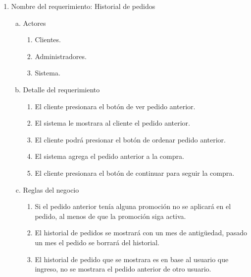 \documentclass[conference]{IEEEtran}
\begin{document}
\begin{enumerate}
\item Nombre del requerimiento: Historial de pedidos
\begin{enumerate}[a)]
\item Actores
	\begin{enumerate}[a]
	\item Clientes.
	\item Administradores.
	\item Sistema.
	\end{enumerate}
\item Detalle del requerimiento
	\begin{enumerate}[P{a}so 1.]
	\item El cliente presionara el botón de ver pedido anterior.
	\item El sistema le mostrara al cliente el pedido anterior.
	\item El cliente podrá presionar el botón de ordenar 	pedido anterior.
	\item El sistema agrega el pedido anterior a la 		compra.
	\item El cliente presionara el botón de continuar 		para seguir la compra.
	\end{enumerate}
\item Reglas del negocio
	\begin{enumerate}[a]
	\item Si el pedido anterior tenía alguna promoción no se aplicará en el pedido, al menos de que la promoción siga activa.
	\item El historial de pedidos se mostrará con un mes de antigüedad, pasado un mes el pedido se borrará del historial.
	\item El historial de pedido que se mostrara es en base al usuario que ingreso, no se mostrara el pedido anterior de otro usuario.

	\end{enumerate}
\end{enumerate}


\end{enumerate}
\end{document}
